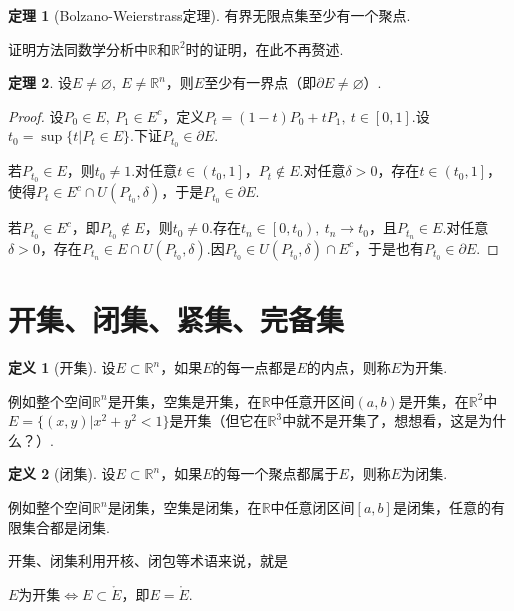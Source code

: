 \documentclass[lang=cn,12pt]{ctexart}
\theoremstyle{definition}
\newtheorem{definition}{定义}
\newtheorem{theorem}{定理}
\theoremstyle{plain}
\begin{document}
\begin{theorem}[Bolzano-Weierstrass定理]
	有界无限点集至少有一个聚点.
\end{theorem}
证明方法同数学分析中$\mathbb{R}$和$\mathbb{R}^2$时的证明，在此不再赘述.
\begin{theorem}
	设$E\neq\varnothing,\ E\neq\mathbb{R}^n$，则$E$至少有一界点（即$\partial E\neq\varnothing$）.
\end{theorem}
\begin{proof}
	设$P_0\in E,\ P_1\in E^c$，定义$P_t=(1-t)P_0+tP_1,\ t\in\left[0,1\right]$.设$t_0=\sup\{t|P_t\in E\}$.下证$P_{t_0}\in\partial E$.
	
	若$P_{t_0}\in E$，则$t_0\neq 1$.对任意$t\in\left(t_0,1\right]$，$P_t\notin E$.对任意$\delta>0$，存在$t\in\left(t_0,1\right]$，使得$P_t\in E^c\cap U(P_{t_0},\delta)$，于是$P_{t_0}\in\partial E$.
	
	若$P_{t_0}\in E^c$，即$P_{t_0}\notin E$，则$t_0\neq 0$.存在$t_n\in\left[0,t_0\right),\ t_n\to t_0$，且$P_{t_n}\in E$.对任意$\delta>0$，存在$P_{t_n}\in E\cap U(P_{t_0},\delta)$.因$P_{t_0}\in U(P_{t_0},\delta)\cap E^c$，于是也有$P_{t_0}\in\partial E$.
\end{proof}
\section{开集、闭集、紧集、完备集}
\begin{definition}[开集]
	设$E\subset\mathbb{R}^n$，如果$E$的每一点都是$E$的内点，则称$E$为{\heiti 开集}.
\end{definition}
例如整个空间$\mathbb{R}^n$是开集，空集是开集，在$\mathbb{R}$中任意开区间$(a,b)$是开集，在$\mathbb{R}^2$中$E=\{(x,y)|x^2+y^2<1\}$是开集（但它在$\mathbb{R}^3$中就不是开集了，想想看，这是为什么？）.
\begin{definition}[闭集]
	设$E\subset\mathbb{R}^n$，如果$E$的每一个聚点都属于$E$，则称$E$为{\heiti 闭集}.
\end{definition}
例如整个空间$\mathbb{R}^n$是闭集，空集是闭集，在$\mathbb{R}$中任意闭区间$\left[a,b\right]$是闭集，任意的有限集合都是闭集.

开集、闭集利用开核、闭包等术语来说，就是

$E$为开集$\iff E\subset\mathring{E}$，即$E=\mathring{E}$.
\end{document}
